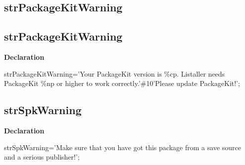 \documentclass{report}
\newif\ifpdf
\begin{document}
\subsection*{\large{\textbf{strPackageKitWarning}}\normalsize\hspace{1ex}\hrulefill}
\else
\subsection*{strPackageKitWarning}
\fi
\label{trstrings-strPackageKitWarning}
\begin{list}{}{
\setlength{\itemindent}{0cm}
\setlength{\listparindent}{0cm}
\setlength{\leftmargin}{\evensidemargin}
\addtolength{\leftmargin}{\tmplength}
\settowidth{\labelsep}{X}
\addtolength{\leftmargin}{\labelsep}
\setlength{\labelwidth}{\tmplength}
}
\item[\textbf{Declaration}\hfill]
\ifpdf
\begin{flushleft}
\fi
\begin{ttfamily}
strPackageKitWarning='Your PackageKit version is {\%}cp. Listaller needs PackageKit {\%}np or higher to work correctly.'{\#}10'Please update PackageKit!';\end{ttfamily}

\ifpdf
\end{flushleft}
\fi

\end{list}
\ifpdf
\subsection*{\large{\textbf{strSpkWarning}}\normalsize\hspace{1ex}\hrulefill}
\else
\subsection*{strSpkWarning}
\fi
\label{trstrings-strSpkWarning}
\begin{list}{}{
\setlength{\itemindent}{0cm}
\setlength{\listparindent}{0cm}
\setlength{\leftmargin}{\evensidemargin}
\addtolength{\leftmargin}{\tmplength}
\settowidth{\labelsep}{X}
\addtolength{\leftmargin}{\labelsep}
\setlength{\labelwidth}{\tmplength}
}
\item[\textbf{Declaration}\hfill]
\ifpdf
\begin{flushleft}
\fi
\begin{ttfamily}
strSpkWarning='Make sure that you have got this package from a save source and a serious publisher!';\end{ttfamily}

\ifpdf
\end{flushleft}
\fi

\end{list}
\ifpdf
\end{document}

